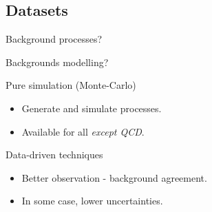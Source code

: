 %

%

\subsection*{Datasets}
%

\begin{frame}
\begin{center}
\LARGE Background processes?
\end{center}
\end{frame}
\addtocounter{framenumber}{-1}



\begin{frame}
\begin{center}
\Large Backgrounds modelling?
\end{center}

\begin{minipage}[t]{.45\textwidth}
\begin{block}{Pure simulation (Monte-Carlo)}
\begin{itemize}
\item Generate and simulate processes.
\item Available for all \emph{except QCD}.
\end{itemize}
\end{block}
\end{minipage}
\hfill
\begin{minipage}[t]{.45\textwidth}
\begin{block}{Data-driven techniques}
\begin{itemize}
\item Better observation - background agreement.
\item In some case, lower uncertainties.
\end{itemize}
\end{block}
\end{minipage}
\end{frame}

